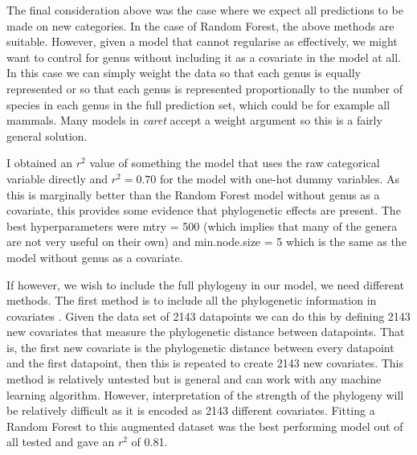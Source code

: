 \documentclass[10pt,]{article}
\begin{document}
The final consideration above was the case where we expect all predictions to be made on new categories. In the case of Random Forest, the above methods are suitable. However, given a model that cannot regularise as effectively, we might want to control for genus without including it as a covariate in the model at all. In this case we can simply weight the data so that each genus is equally represented or so that each genus is represented proportionally to the number of species in each genus in the full prediction set, which could be for example all mammals. Many models in \emph{caret} accept a weight argument so this is a fairly general solution.

I obtained an \(r^2\) value of something the model that uses the raw categorical variable directly and \(r^2 = 0.70\) for the model with one-hot dummy variables. As this is marginally better than the Random Forest model without genus as a covariate, this provides some evidence that phylogenetic effects are present. The best hyperparameters were mtry = 500 (which implies that many of the genera are not very useful on their own) and min.node.size = 5 which is the same as the model without genus as a covariate.

If however, we wish to include the full phylogeny in our model, we need different methods. The first method is to include all the phylogenetic information in covariates \citep{hengl2018random}. Given the data set of 2143 datapoints we can do this by defining 2143 new covariates that measure the phylogenetic distance between datapoints. That is, the first new covariate is the phylogenetic distance between every datapoint and the first datapoint, then this is repeated to create 2143 new covariates. This method is relatively untested but is general and can work with any machine learning algorithm. However, interpretation of the strength of the phylogeny will be relatively difficult as it is encoded as 2143 different covariates. Fitting a Random Forest to this augmented dataset was the best performing model out of all tested and gave an \(r^2\) of 0.81.
\end{document}
